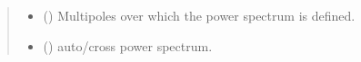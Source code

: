 \documentclass[letterpaper,10pt,english]{sphinxmanual}
\begin{document}
\begin{fulllineitems}
\begin{quote}
\begin{description}
\begin{itemize}
\end{itemize}

\sphinxAtStartPar
\begin{itemize}
\item {} 
\sphinxAtStartPar
{} () \textendash{} Multipoles over which the power spectrum is defined.

\item {} 
\sphinxAtStartPar
{} () \textendash{} auto/cross power spectrum.

\end{itemize}


\end{description}\end{quote}

\end{fulllineitems}

\end{document}

